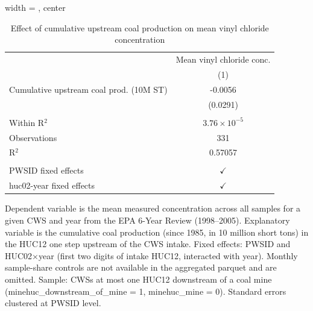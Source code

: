 
\begin{table}[htbp]
   
   \caption{\label{tab:6yr_huc02fe_vinyl_chloride_mean} Effect of cumulative upstream coal production on mean vinyl chloride concentration}
   \bigskip
   
   \centering
   
   \begin{adjustbox}{width = \textwidth, center}
      
      
      \begin{tabular}{lc}
         \toprule
         
                                                 & Mean vinyl chloride conc.\\  
         
                                                 & (1)\\  
         
         \midrule 
         Cumulative upstream coal prod. (10M ST) & -0.0056\\   
                                                 & (0.0291)\\   
         
          \\
         
         Within R$^2$                            & $3.76\times 10^{-5}$\\   
         Observations                            & 331\\  
         R$^2$                                   & 0.57057\\  
         
          \\
         
         PWSID fixed effects                     & $\checkmark$\\   
         huc02-year fixed effects                & $\checkmark$\\   
         
         \bottomrule
         
      \end{tabular}
      
      
      
   \end{adjustbox}
      {\tiny\linespread{1}\selectfont \par \raggedright 
   Dependent variable is the mean measured concentration across all samples for a given CWS and year from the EPA 6-Year Review (1998--2005). Explanatory variable is the cumulative coal production (since 1985, in 10 million short tons) in the HUC12 one step upstream of the CWS intake. Fixed effects: PWSID and HUC02$\times$year (first two digits of intake HUC12, interacted with year). Monthly sample-share controls are not available in the aggregated parquet and are omitted. Sample: CWSs at most one HUC12 downstream of a coal mine (minehuc\_downstream\_of\_mine = 1, minehuc\_mine = 0). Standard errors clustered at PWSID level.}
   
\end{table}



